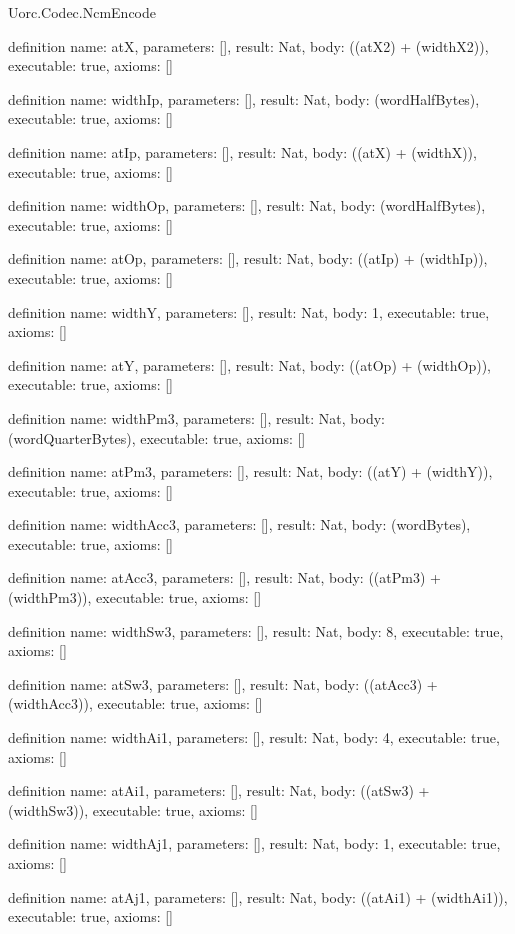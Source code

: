 \begin{lexlean}{Uorc.Codec.NcmEncode}
\begin{semanticmodule}
definition{
  name: atX,
  parameters: [],
  result: Nat,
  body: ((atX2) + (widthX2)),
  executable: true,
  axioms: []
}

definition{
  name: widthIp,
  parameters: [],
  result: Nat,
  body: (wordHalfBytes),
  executable: true,
  axioms: []
}

definition{
  name: atIp,
  parameters: [],
  result: Nat,
  body: ((atX) + (widthX)),
  executable: true,
  axioms: []
}

definition{
  name: widthOp,
  parameters: [],
  result: Nat,
  body: (wordHalfBytes),
  executable: true,
  axioms: []
}

definition{
  name: atOp,
  parameters: [],
  result: Nat,
  body: ((atIp) + (widthIp)),
  executable: true,
  axioms: []
}

definition{
  name: widthY,
  parameters: [],
  result: Nat,
  body: 1,
  executable: true,
  axioms: []
}

definition{
  name: atY,
  parameters: [],
  result: Nat,
  body: ((atOp) + (widthOp)),
  executable: true,
  axioms: []
}

definition{
  name: widthPm3,
  parameters: [],
  result: Nat,
  body: (wordQuarterBytes),
  executable: true,
  axioms: []
}

definition{
  name: atPm3,
  parameters: [],
  result: Nat,
  body: ((atY) + (widthY)),
  executable: true,
  axioms: []
}

definition{
  name: widthAcc3,
  parameters: [],
  result: Nat,
  body: (wordBytes),
  executable: true,
  axioms: []
}

definition{
  name: atAcc3,
  parameters: [],
  result: Nat,
  body: ((atPm3) + (widthPm3)),
  executable: true,
  axioms: []
}

definition{
  name: widthSw3,
  parameters: [],
  result: Nat,
  body: 8,
  executable: true,
  axioms: []
}

definition{
  name: atSw3,
  parameters: [],
  result: Nat,
  body: ((atAcc3) + (widthAcc3)),
  executable: true,
  axioms: []
}

definition{
  name: widthAi1,
  parameters: [],
  result: Nat,
  body: 4,
  executable: true,
  axioms: []
}

definition{
  name: atAi1,
  parameters: [],
  result: Nat,
  body: ((atSw3) + (widthSw3)),
  executable: true,
  axioms: []
}

definition{
  name: widthAj1,
  parameters: [],
  result: Nat,
  body: 1,
  executable: true,
  axioms: []
}

definition{
  name: atAj1,
  parameters: [],
  result: Nat,
  body: ((atAi1) + (widthAi1)),
  executable: true,
  axioms: []
}


\end{semanticmodule}
\end{lexlean}
